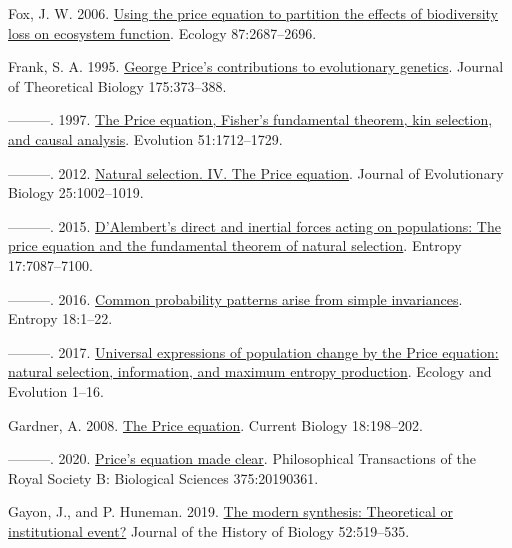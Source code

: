 \documentclass[
]{article}
\newlength{\cslhangindent}
\newlength{\cslentryspacingunit} %
\newenvironment{CSLReferences}[2] %
 {%
  \setlength{\parindent}{0pt}
  \ifodd #1
  \let\oldpar\par
  \def\par{\hangindent=\cslhangindent\oldpar}
  \fi
  \setlength{\parskip}{#2\cslentryspacingunit}
 }%
 {}
\begin{document}
\begin{CSLReferences}{0}{0}
\leavevmode{}%
Fox, J. W. 2006.
\href{https://doi.org/10.1890/0012-9658(2006)87\%5B2687:utpetp\%5D2.0.co;2}{{Using
the price equation to partition the effects of biodiversity loss on
ecosystem function}}. Ecology 87:2687--2696.

\leavevmode{}%
Frank, S. A. 1995. \href{https://doi.org/10.1006/jtbi.1995.0148}{{George
Price's contributions to evolutionary genetics}}. Journal of Theoretical
Biology 175:373--388.

\leavevmode{}%
---------. 1997.
\href{https://doi.org/10.1111/j.1558-5646.1997.tb05096.x}{{The Price
equation, Fisher's fundamental theorem, kin selection, and causal
analysis}}. Evolution 51:1712--1729.

\leavevmode{}%
---------. 2012.
\href{https://doi.org/10.1111/j.1420-9101.2012.02498.x}{{Natural
selection. IV. The Price equation}}. Journal of Evolutionary Biology
25:1002--1019.

\leavevmode{}%
---------. 2015. \href{https://doi.org/10.3390/e17107087}{{D'Alembert's
direct and inertial forces acting on populations: The price equation and
the fundamental theorem of natural selection}}. Entropy 17:7087--7100.

\leavevmode{}%
---------. 2016. \href{https://doi.org/10.3390/e18050192}{{Common
probability patterns arise from simple invariances}}. Entropy 18:1--22.

\leavevmode{}%
---------. 2017. \href{https://doi.org/10.1002/ece3.2922}{{Universal
expressions of population change by the Price equation: natural
selection, information, and maximum entropy production}}. Ecology and
Evolution 1--16.

\leavevmode{}%
Gardner, A. 2008. \href{https://doi.org/10.1016/j.cub.2008.01.005}{{The
Price equation}}. Current Biology 18:198--202.

\leavevmode{}%
---------. 2020. \href{https://doi.org/10.1098/rstb.2019.0361}{{Price's
equation made clear}}. Philosophical Transactions of the Royal Society
B: Biological Sciences 375:20190361.

\leavevmode{}%
Gayon, J., and P. Huneman. 2019.
\href{https://doi.org/10.1007/s10739-019-09569-2}{The modern synthesis:
Theoretical or institutional event?} Journal of the History of Biology
52:519--535.


\end{CSLReferences}
\end{document}
